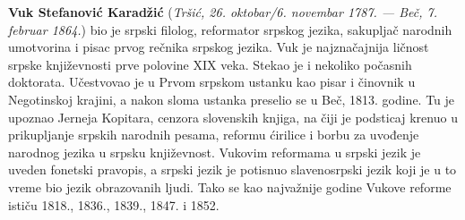 \documentclass[12pt,oneside]{memoir}
\begin{document}
\literatura

\backmatter

\begin{biografija}
  \textbf{Vuk Stefanović Karadžić} (\emph{Tršić,
    26. oktobar/6. novembar 1787. — Beč, 7. februar 1864.}) bio je
  srpski filolog, reformator srpskog jezika, sakupljač narodnih
  umotvorina i pisac prvog rečnika srpskog jezika.  Vuk je
  najznačajnija ličnost srpske književnosti prve polovine XIX
  veka. Stekao je i nekoliko počasnih doktorata.  Učestvovao je u
  Prvom srpskom ustanku kao pisar i činovnik u Negotinskoj krajini, a
  nakon sloma ustanka preselio se u Beč, 1813. godine. Tu je upoznao
  Jerneja Kopitara, cenzora slovenskih knjiga, na čiji je podsticaj
  krenuo u prikupljanje srpskih narodnih pesama, reformu ćirilice i
  borbu za uvođenje narodnog jezika u srpsku književnost. Vukovim
  reformama u srpski jezik je uveden fonetski pravopis, a srpski jezik
  je potisnuo slavenosrpski jezik koji je u to vreme bio jezik
  obrazovanih ljudi. Tako se kao najvažnije godine Vukove reforme
  ističu 1818., 1836., 1839., 1847. i 1852.
\end{biografija}





\end{document}
